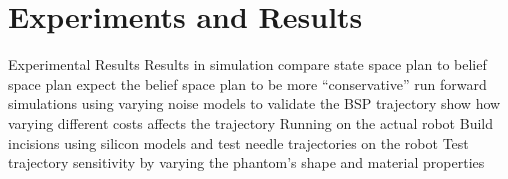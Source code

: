 \section{Experiments and Results}
\label{sec:expt}


Experimental Results
Results in simulation
compare state space plan to belief space plan
expect the belief space plan to be more “conservative”
run forward simulations using varying noise models to validate the BSP trajectory
show how varying different costs affects the trajectory
Running on the actual robot
Build incisions using silicon models and test needle trajectories on the robot
Test trajectory sensitivity by varying the phantom’s shape and material properties

